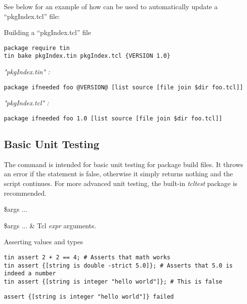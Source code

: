 \documentclass{article}
\begin{document}
See below for an example of how  can be used to automatically update a ``pkgIndex.tcl'' file:

\begin{example}{Building a ``pkgIndex.tcl'' file}
\begin{lstlisting}
package require tin
tin bake pkgIndex.tin pkgIndex.tcl {VERSION 1.0}
\end{lstlisting}
\tcblower

\textit{"pkgIndex.tin" :}
\begin{lstlisting}
package ifneeded foo @VERSION@ [list source [file join $dir foo.tcl]]
\end{lstlisting}
\textit{"pkgIndex.tcl" :}
\begin{lstlisting}
package ifneeded foo 1.0 [list source [file join $dir foo.tcl]]
\end{lstlisting}
\end{example}
\clearpage
\subsection{Basic Unit Testing}
The command  is intended for basic unit testing for package build files.
It throws an error if the statement is false, otherwise it simply returns nothing and the script continues.
For more advanced unit testing, the built-in \textit{tcltest} package is recommended.
\begin{syntax}
 \$args ...
\end{syntax}
\begin{args}
\$args ... & Tcl \textit{expr} arguments.
\end{args}
\begin{example}{Asserting values and types}
\begin{lstlisting}
tin assert 2 + 2 == 4; # Asserts that math works
tin assert {[string is double -strict 5.0]}; # Asserts that 5.0 is indeed a number
tin assert {[string is integer "hello world"]}; # This is false
\end{lstlisting} 
\tcblower
\begin{lstlisting}
assert {[string is integer "hello world"]} failed
\end{lstlisting}
\end{example}
\end{document}
